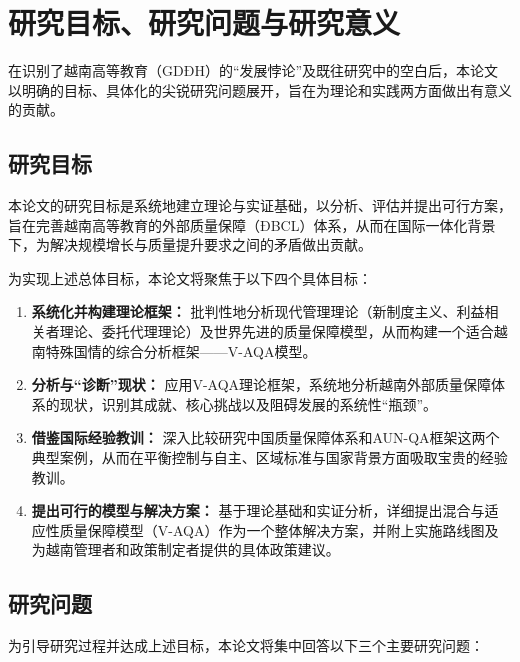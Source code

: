 
\section{研究目标、研究问题与研究意义}
\label{sec:muc_tieu_y_nghia}

在识别了越南高等教育（GDĐH）的“发展悖论”及既往研究中的空白后，本论文以明确的目标、具体化的尖锐研究问题展开，旨在为理论和实践两方面做出有意义的贡献。

\subsection{研究目标}
\label{subsec:muc_tieu_nghien_cuu}

本论文的研究目标是系统地建立理论与实证基础，以分析、评估并提出可行方案，旨在完善越南高等教育的外部质量保障（ĐBCL）体系，从而在国际一体化背景下，为解决规模增长与质量提升要求之间的矛盾做出贡献。

为实现上述总体目标，本论文将聚焦于以下四个具体目标：
\begin{enumerate}
    \item \textbf{系统化并构建理论框架：} 批判性地分析现代管理理论（新制度主义、利益相关者理论、委托代理理论）及世界先进的质量保障模型，从而构建一个适合越南特殊国情的综合分析框架——V-AQA模型。
    
    \item \textbf{分析与“诊断”现状：} 应用V-AQA理论框架，系统地分析越南外部质量保障体系的现状，识别其成就、核心挑战以及阻碍发展的系统性“瓶颈”。
    
    \item \textbf{借鉴国际经验教训：} 深入比较研究中国质量保障体系和AUN-QA框架这两个典型案例，从而在平衡控制与自主、区域标准与国家背景方面吸取宝贵的经验教训。
    
    \item \textbf{提出可行的模型与解决方案：} 基于理论基础和实证分析，详细提出混合与适应性质量保障模型（V-AQA）作为一个整体解决方案，并附上实施路线图及为越南管理者和政策制定者提供的具体政策建议。
\end{enumerate}

\subsection{研究问题}
\label{subsec:cau_hoi_nghien_cuu}

为引导研究过程并达成上述目标，本论文将集中回答以下三个主要研究问题：


